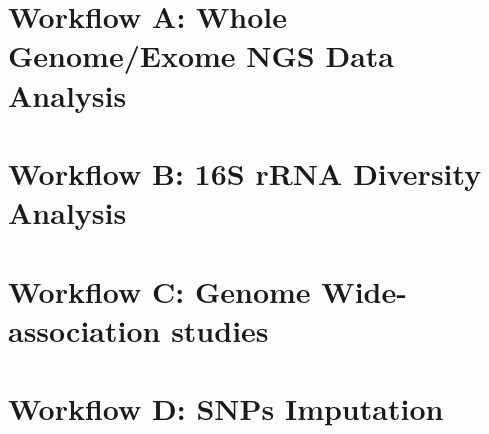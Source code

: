 \documentclass[a4paper,12pt,landscape]{article}
\begin{document}
  \section{Workflow A: Whole Genome/Exome NGS Data Analysis}
  \begin{figure}[ht!]
    \centering{
      
    }
  \end{figure}

  \newpage
  \section{Workflow B: 16S rRNA Diversity Analysis}
  \begin{figure}[ht!]
    \centering{
      
    }
  \end{figure}

  \newpage
  \section{Workflow C: Genome Wide-association studies}
  \begin{figure}[ht!]
    \centering{
      
    }
  \end{figure}

  \newpage
  \section{Workflow D: SNPs Imputation}
  \begin{figure}[ht!]
    \centering{
      
    }
  \end{figure}
\end{document}
